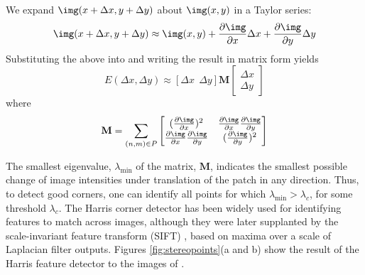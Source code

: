 We expand $\img (x + \Delta x, y + \Delta y)$ about $\img (x, y)$ in a Taylor series:
\begin{equation}
    \img (x + \Delta x, y + \Delta y) \approx
    \img (x, y) + \frac{\partial \img}{\partial x} \Delta x
    + \frac{\partial \img}{\partial y} \Delta y
\end{equation}
Substituting the above into \eqn{\ref{eq:harris}} and writing the result in matrix form yields
\begin{equation}
       E(\Delta x, \Delta y) \approx
       \left[ 
       \Delta x ~~ \Delta y
       \right]
       \mathbf{M} 
       \left[ \begin{array}{c}
       \Delta x \\
       \Delta y
       \end{array}
       \right]
\end{equation}
where
\begin{equation}
\mathbf{M} = \sum_{(n, m) \in P}
\begin{bmatrix}
(\frac{\partial \img}{\partial x})^2 & 
\frac{\partial \img}{\partial x} 
\frac{\partial \img}{\partial y} \\
\frac{\partial \img}{\partial x} 
\frac{\partial \img}{\partial y} 
& (\frac{\partial \img}{\partial y})^2
\end{bmatrix} 
\end{equation}

The smallest eigenvalue, $\lambda_{\mbox{min}}$ of the matrix, $\mathbf{M}$, indicates the smallest possible change of image intensities under translation of the patch in any direction.  Thus, to detect good corners, one can identify all points for which $\lambda_{\mbox{min}} > \lambda_c$, for some threshold $\lambda_c$.
The Harris corner detector has been widely used for identifying features to match across images, although they were later supplanted by the scale-invariant feature transform (SIFT) \cite{Lowe04},
based on maxima over a scale of Laplacian filter outputs.  Figures \ref{fig:stereopoints}(a and b) show the result of the Harris feature detector to the images of \fig{\ref{fig:stereomatch}}.


